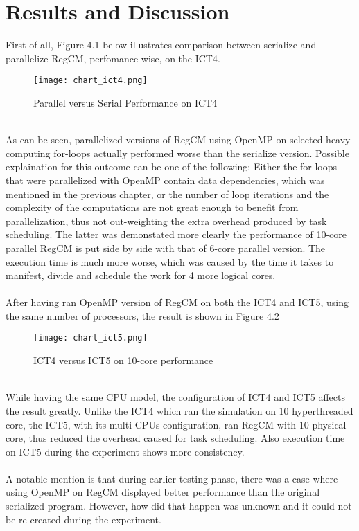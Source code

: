 \section{Results and Discussion}

First of all, Figure 4.1 below illustrates comparison between serialize and parallelize RegCM, perfomance-wise, on the ICT4. \\
\begin{figure}[H]
\texttt{[image: chart\_ict4.png]}
\centering
\caption{Parallel versus Serial Performance on ICT4}
\end{figure}
~\\
As can be seen, parallelized versions of RegCM using OpenMP on selected heavy computing for-loops actually performed worse than the serialize version. Possible explaination for this outcome can be one of the following: Either the for-loops that were parallelized with OpenMP contain data dependencies, which was mentioned in the previous chapter, or the number of loop iterations and the complexity of the computations are not great enough to benefit from parallelization, thus not out-weighting the extra overhead produced by task scheduling. The latter was demonstated more clearly the performance of 10-core parallel RegCM is put side by side with that of 6-core parallel version. The execution time is much more worse, which was caused by the time it takes to manifest, divide and schedule the work for 4 more logical cores. \\
~\\
After having ran OpenMP version of RegCM on both the ICT4 and ICT5, using the same number of processors, the result is shown in Figure 4.2
\begin{figure}[H]
\texttt{[image: chart\_ict5.png]}
\centering
\caption{ICT4 versus ICT5 on 10-core performance}
\end{figure}
~\\
While having the same CPU model, the configuration of ICT4 and ICT5 affects the result greatly. Unlike the ICT4 which ran the simulation on 10 hyperthreaded core, the ICT5, with its multi CPUs configuration, ran RegCM with 10 physical core, thus reduced the overhead caused for task scheduling. Also execution time on ICT5 during the experiment shows more consistency. \\
~\\
A notable mention is that during earlier testing phase, there was a case where using OpenMP on RegCM displayed better performance than the original serialized program. However, how did that happen was unknown and it could not be re-created during the experiment.

